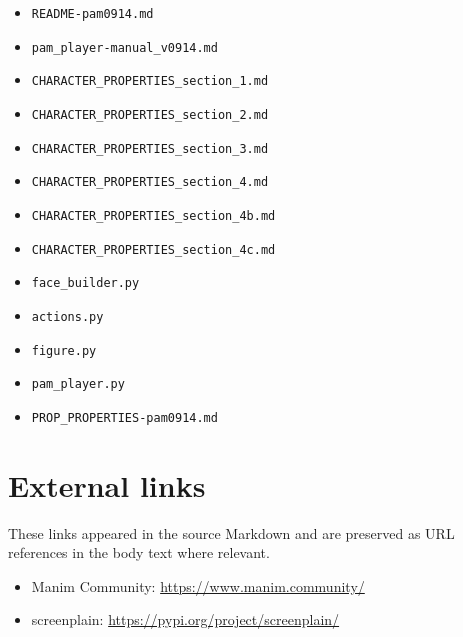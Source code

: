 \documentclass[
  11pt,
]{book}
\providecommand{\tightlist}{%
  \setlength{\itemsep}{0pt}\setlength{\parskip}{0pt}}
\begin{document}
\begin{itemize}
\tightlist
\item
  \texttt{README-pam0914.md}
\item
  \texttt{pam\_player-manual\_v0914.md}
\item
  \texttt{CHARACTER\_PROPERTIES\_section\_1.md}
\item
  \texttt{CHARACTER\_PROPERTIES\_section\_2.md}
\item
  \texttt{CHARACTER\_PROPERTIES\_section\_3.md}
\item
  \texttt{CHARACTER\_PROPERTIES\_section\_4.md}
\item
  \texttt{CHARACTER\_PROPERTIES\_section\_4b.md}
\item
  \texttt{CHARACTER\_PROPERTIES\_section\_4c.md}
\item
  \texttt{face\_builder.py}
\item
  \texttt{actions.py}
\item
  \texttt{figure.py}
\item
  \texttt{pam\_player.py}
\item
  \texttt{PROP\_PROPERTIES-pam0914.md}
\end{itemize}

\section{External links}\label{external-links}

These links appeared in the source Markdown and are preserved as URL
references in the body text where relevant.

\begin{itemize}
\tightlist
\item
  Manim Community: \url{https://www.manim.community/}
\item
  screenplain: \url{https://pypi.org/project/screenplain/}
\end{itemize}

\printindex

\backmatter
\end{document}
